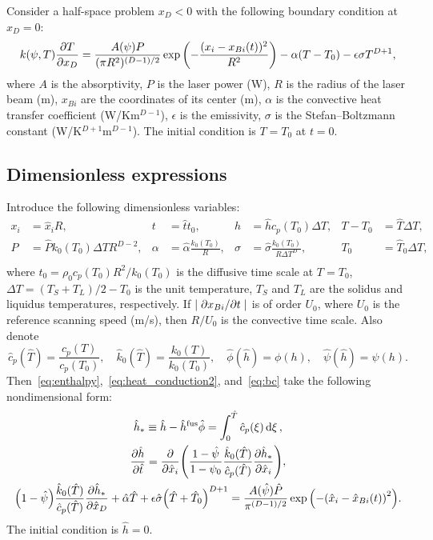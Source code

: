 \documentclass{article}
\newcommand{\fusion}[1]{{#1}^\mathrm{fus}}
\newcommand{\Hx}{\hat{x}}
\newcommand{\Ht}{\hat{t}}
\newcommand{\Hh}{\hat{h}}
\newcommand{\HT}{\hat{T}}
\newcommand{\HP}{\hat{P}}
\newcommand{\Halpha}{\hat{\alpha}}
\newcommand{\Hsigma}{\hat{\sigma}}
\newcommand{\Hc}{\hat{c}}
\newcommand{\Hk}{\hat{k}}
\newcommand{\Hphi}{\hat{\phi}}
\newcommand{\Hpsi}{\hat{\psi}}
\begin{document}
Consider a half-space problem \(x_D<0\) with the following boundary condition at \(x_D=0\):
\begin{equation}\label{eq:bc}
	k(\psi,T)\pdv{T}{x_D} = \frac{A(\psi)P}{(\pi R^2)^{(D-1)/2}}\exp\qty( -\frac{(x_i-x_{Bi}(t))^2}{R^2} )
	    - \alpha(T-T_0) - \epsilon\sigma T^{D+1},
\end{equation}
where \(A\) is the absorptivity, \(P\) is the laser power (\si{W}), \(R\) is the radius of the laser beam (\si{m}),
\(x_{Bi}\) are the coordinates of its center (\si{m}), \(\alpha\) is the convective heat transfer coefficient (\si{W/Km}\(^{D-1}\)),
\(\epsilon\) is the emissivity, \(\sigma\) is the Stefan--Boltzmann constant (\si{W/K}\(^{D+1}\)\si{m}\(^{D-1}\)).
The initial condition is \(T=T_0\) at \(t=0\).

\subsection{Dimensionless expressions}

Introduce the following dimensionless variables:
\begin{equation}\label{eq:dimensionless}
    \begin{aligned}
        x_i &= \Hx_iR, & t &= \Ht t_0, & h &= \Hh c_p(T_0)\Delta{T}, & T - T_0 &= \HT\Delta{T}, \\
        P &= \HP k_0(T_0)\Delta{T}R^{D-2}, & \alpha &= \Halpha\frac{k_0(T_0)}R, &
            \sigma &= \Hsigma\frac{k_0(T_0)}{R\Delta{T}^D}, & T_0 &= \HT_0\Delta{T}, \\
    \end{aligned}
\end{equation}
where \(t_0 = \rho_0 c_p(T_0) R^2/k_0(T_0)\) is the diffusive time scale at \(T=T_0\),
\(\Delta{T} = (T_S+T_L)/2 - T_0\) is the unit temperature,
\(T_S\) and \(T_L\) are the solidus and liquidus temperatures, respectively.
If \(|\pdv*{x_{Bi}}{t}|\) is of order \(U_0\), where \(U_0\) is the reference scanning speed (\si{m/s}),
then \(R/U_0\) is the convective time scale. Also denote
\begin{equation}\label{eq:dimensionless2}
    \Hc_p(\HT) = \frac{c_p(T)}{c_p(T_0)}, \quad
    \Hk_0(\HT) = \frac{k_0(T)}{k_0(T_0)}, \quad
    \Hphi(\Hh) = \phi(h), \quad
    \Hpsi(\Hh) = \psi(h).
\end{equation}
Then~\eqref{eq:enthalpy},~\eqref{eq:heat_conduction2}, and~\eqref{eq:bc} take the following nondimensional form:
\begin{gather}
	\Hh_* \equiv \Hh - \fusion{\Hh}\Hphi = \int_0^{\HT} \Hc_p(\xi)\dd{\xi}, \label{eq:enthalpy_hats} \\
	\pdv{\Hh}{\Ht} = \pdv{\Hx_i}\qty(
	    \frac{1-\Hpsi}{1-\psi_0}
	    \frac{\Hk_0(\HT)}{\Hc_p(\HT)}\pdv{\Hh_*}{\Hx_i}
	), \label{eq:heat_conduction_hats} \\
	\qty(1 - \Hpsi) \frac{\Hk_0(\HT)}{\Hc_p(\HT)}\pdv{\Hh_*}{\Hx_D} +
	    \Halpha\HT + \epsilon\Hsigma \qty(\HT + \HT_0)^{D+1} =
	    \frac{A(\Hpsi)\HP}{\pi^{(D-1)/2}}\exp\qty( -\qty(\Hx_i-\Hx_{Bi}(t))^2 ). \label{eq:bc_hats}
\end{gather}
The initial condition is \(\Hh = 0\).
\end{document}

